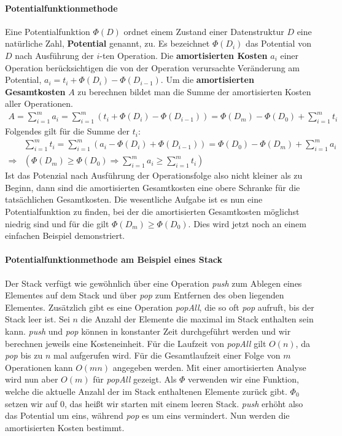 \documentclass[a4paper,12pt]{article}
\begin{document}
\paragraph{Potentialfunktionmethode} Eine Potentialfunktion $\Phi(D)$ ordnet einem Zustand einer Datenstruktur $D$ eine natürliche Zahl, \textbf{Potential} genannt, zu. Es bezeichnet $\Phi(D_i)$ das Potential von $D$ nach Ausführung der $i$-ten Operation. Die \textbf{amortisierten Kosten} $a_i$ einer Operation berücksichtigen die von der Operation verursachte Veränderung am Potential, $a_i = t_i + \Phi(D_{i}) - \Phi(D_{i-1})$. Um die \textbf{amortisierten Gesamtkosten} $A$ zu berechnen bildet man die Summe der amortisierten Kosten aller Operationen. 
\begin{align*}
A = \sum_{i = 1}^{m} a_i =  \sum_{i = 1}^{m} \left(t_i + \Phi\left(D_{i}\right) - \Phi\left(D_{i-1}\right)\right) = \Phi\left(D_{m}\right) - \Phi\left(D_{0}\right) + \sum_{i = 1}^{m} t_i 
\end{align*}
Folgendes gilt für die Summe der $t_i$:
\begin{align*}
&\sum_{i = 1}^{m} t_i =  \sum_{i = 1}^{m} \left(a_i - \Phi\left(D_{i}\right) + \Phi\left(D_{i-1}\right)\right) = \Phi\left(D_{0}\right) - \Phi\left(D_{m}\right) + \sum_{i = 1}^{m} a_i \\
\Rightarrow &\left( \Phi\left(D_{m}\right) \geq \Phi\left(D_{0}\right) \Rightarrow \sum_{i = 1}^{m} a_i \geq \sum_{i = 1}^{m} t_i \right)
\end{align*}
Ist das Potenzial nach Ausführung der Operationsfolge also nicht kleiner als zu Beginn, dann sind die amortisierten Gesamtkosten eine obere Schranke für die tatsächlichen Gesamtkosten. Die wesentliche Aufgabe ist es nun eine Potentialfunktion zu finden, bei der die amortisierten Gesamtkosten möglichst niedrig sind und für die gilt $\Phi\left(D_{m}\right) \geq \Phi\left(D_{0}\right)$. Dies wird jetzt noch an einem einfachen Beispiel demonstriert.

\paragraph{Potentialfunktionmethode am Beispiel eines Stack} 
Der Stack verfügt wie gewöhnlich über eine Operation \textit{push} zum Ablegen eines Elementes auf dem Stack und über \textit{pop} zum Entfernen des oben liegenden Elementes. Zusätzlich gibt es eine Operation \textit{popAll}, die so oft \textit{pop} aufruft, bis der Stack leer ist. Sei $n$ die Anzahl der Elemente die maximal im Stack enthalten sein kann. \textit{push} und \textit{pop} können in konstanter Zeit durchgeführt werden und wir berechnen jeweils eine Kosteneinheit. Für die Laufzeit von \textit{popAll} gilt $O(n)$, da \textit{pop} bis zu $n$ mal aufgerufen wird. Für die Gesamtlaufzeit einer Folge von $m$ Operationen kann $O(mn)$ angegeben werden. Mit einer amortisierten Analyse wird nun aber $O(m)$ für \textit{popAll} gezeigt. Als $\Phi$ verwenden wir eine Funktion, welche die aktuelle Anzahl der im Stack enthaltenen Elemente zurück gibt. $\Phi_0$ setzen wir auf $0$, das heißt wir starten mit einem leeren Stack. \textit{push} erhöht also das Potential um eins, während \textit{pop} es um eins vermindert. Nun werden die amortisierten Kosten bestimmt. 
\end{document}
